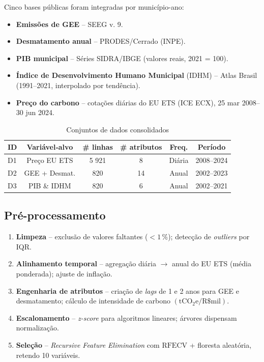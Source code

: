 \documentclass[conference]{IEEEtran}
\begin{document}
Cinco bases públicas foram integradas por município-ano:

\begin{itemize}
  \item \textbf{Emissões de GEE} – SEEG v. 9.
  \item \textbf{Desmatamento anual} – PRODES/Cerrado (INPE).
  \item \textbf{PIB municipal} – Séries SIDRA/IBGE (valores reais, 2021 = 100).
  \item \textbf{Índice de Desenvolvimento Humano Municipal} (IDHM) – Atlas Brasil (1991–2021, interpolado por tendência).
  \item \textbf{Preço do carbono} – cotações diárias do EU ETS (ICE ECX), 25 mar 2008–30 jun 2024.
\end{itemize}

\begin{table}[!t]
  \caption{Conjuntos de dados consolidados}\label{tab:datasets}
  \centering
  \footnotesize
  \begin{tabular}{lccccc}
    \toprule
    \textbf{ID} & \textbf{Variável‐alvo} & \textbf{\# linhas} & \textbf{\# atributos} & \textbf{Freq.} & \textbf{Período} \\ \midrule
    D1 & Preço EU ETS & 5 921 & 8 & Diária & 2008–2024 \\
    D2 & GEE + Desmat. &  820 & 14 & Anual  & 2002–2023 \\
    D3 & PIB \& IDHM    &  820 &  6 & Anual  & 2002–2021 \\ \bottomrule
  \end{tabular}
\end{table}

\subsection{Pré-processamento}

\begin{enumerate}[leftmargin=*]
  \item \textbf{Limpeza} – exclusão de valores faltantes (\(<1\,\%\)); detecção de \emph{outliers} por IQR.
  \item \textbf{Alinhamento temporal} – agregação diária \(\rightarrow\) anual do EU ETS (média ponderada); ajuste de inflação.
  \item \textbf{Engenharia de atributos} – criação de \emph{lags} de 1 e 2 anos para GEE e desmatamento; cálculo de intensidade de carbono \((\text{tCO}_2\mathrm{e}/\text{R\$ mil})\).
  \item \textbf{Escalonamento} – \emph{z-score} para algoritmos lineares; árvores dispensam normalização.
  \item \textbf{Seleção} – \emph{Recursive Feature Elimination} com \(\text{RFECV}\) + floresta aleatória, retendo 10 variáveis.
\end{enumerate}
\end{document}
